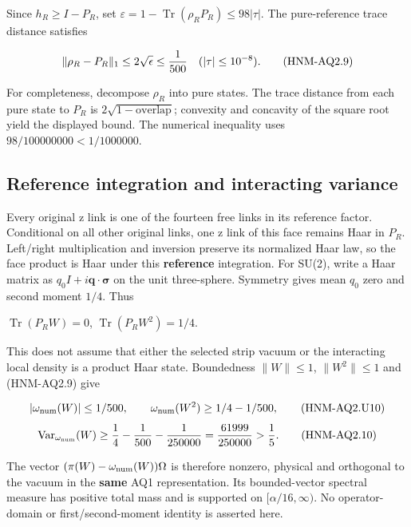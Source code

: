 Since \(h_R\ge I-P_R\), set \(\varepsilon=1-\operatorname{Tr}(\rho_RP_R)\le98|\tau|\). The pure-reference trace distance satisfies

\begin{equation}
\|\rho_R-P_R\|_1\le2\sqrt\epsilon\le {1\over500}
\quad(|\tau|\le10^{-8}).\tag{HNM-AQ2.9}
\label{r29:aq2:eq9}
\end{equation}

For completeness, decompose \(\rho_R\) into pure states. The trace distance from each pure state to \(P_R\) is \(2\sqrt{1-\mathrm{overlap}}\); convexity and concavity of the square root yield the displayed bound. The numerical inequality uses \(98/100000000<1/1000000\).

\hypertarget{r29-aq2-reference-integration-and-interacting-variance}{%
\subsection{Reference integration and interacting variance}\label{r29:aq2:r29-aq2-reference-integration-and-interacting-variance}}

Every original z link is one of the fourteen free links in its reference factor. Conditional on all other original links, one z link of this face remains Haar in \(P_R\). Left/right multiplication and inversion preserve its normalized Haar law, so the face product is Haar under this \textbf{reference} integration. For SU(2), write a Haar matrix as \(q_0I+i\boldsymbol q\cdot\boldsymbol\sigma\) on the unit three-sphere. Symmetry gives mean \(q_0\) zero and second moment \(1/4\). Thus

\(\operatorname{Tr}(P_RW)=0\), \(\operatorname{Tr}(P_RW^2)=1/4\).

This does not assume that either the selected strip vacuum or the interacting local density is a product Haar state. Boundedness \(\|W\|\le 1\), \(\|W^{2}\|\le 1\) and (HNM-AQ2.9) give

\begin{equation}
|\omega_{\rm num}(W)|\le1/500,\qquad
\omega_{\rm num}(W^2)\ge1/4-1/500,
\tag{HNM-AQ2.U10}
\label{r29:aq2:eq10}
\end{equation} \begin{equation}
\operatorname{Var}_{\omega_{\rm num}}(W)
\ge{1\over4}-{1\over500}-{1\over250000}
={61999\over250000}>{1\over5}.\tag{HNM-AQ2.10}
\label{r29:aq2:eq11}
\end{equation}

The vector \((\pi(W)-\omega_{\rm num}(W))\Omega\) is therefore nonzero, physical and orthogonal to the vacuum in the \textbf{same} AQ1 representation. Its bounded-vector spectral measure has positive total mass and is supported on \([\alpha/16,\infty)\). No operator-domain or first/second-moment identity is asserted here.

